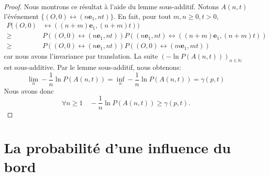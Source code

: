 \documentclass[titlepage,a4paper,12pt]{article}
\newcounter{prop}
\newtheorem{tension}[prop]{Proposition}
\begin{document}
\begin{proof}
Nous montrons ce résultat à l'aide du lemme sous-additif. Notons $A(n,t)$ l'événement $\{(O,0)\longleftrightarrow (n\mathbf{e}_1,nt)\}$. En fait, pour tout $m,n\geqslant 0, t>0$,
\begin{align*}
P((O,0)& \leftrightarrow ((n+m)\mathbf{e}_1,(n+m)t)) \\
\geqslant & P((O,0)\leftrightarrow (n\mathbf{e}_1,nt))P((n\mathbf{e}_1,nt)\leftrightarrow ((n+m)\mathbf{e}_1,(n+m)t))\\
\geqslant & P((O,0)\leftrightarrow (n\mathbf{e}_1,nt))P((O,0)\leftrightarrow (m\mathbf{e}_1,mt))
\end{align*}
car nous avons l'invariance par translation. La suite $(-\ln P(A(n,t)))_{n\in \mathbb{N}}$ est sous-additive. Par le lemme sous-additif, nous obtenons:
$$
\lim_{n}-\frac{1}{n}\ln P(A(n,t)) = \inf_{n} -\frac{1}{n}\ln P(A(n,t)) = \gamma(p,t)
$$
Nous avons donc
$$ \forall n\geqslant 1 \quad -\frac{1}{n}\ln P(A(n,t)) \geqslant \gamma(p,t).
$$
\end{proof}

\begin{comment}
Nous étudions la constante $\gamma(p,t)$ et nous avons la proposition suivante:
\begin{tension}$\frac{\gamma(p,t)}{\gamma(p,0)} \rightarrow 1$ quand $p\rightarrow 1$.
\end{tension}
\begin{proof}
Nous utilisons le fait que $\lim_n \frac{1}{n}\ln P(O\longleftrightarrow n\mathbf{e}_1) = \lim_n \frac{1}{n}\ln P(O\longleftrightarrow \partial \Lambda_n)$ et nous considérons une boite de taille $n$. Nous remarquons le nombre d'arête qui se ferme entre $[0,t]$ est borné par une loi de Poisson de paramètre $n^2(1-p)t$. Nous notons $N$ le nombre de bout d'un space-time chemin, c'est-à-dire le nombre de chemins fermés tel que $$ (O,0) = (x_1,\theta_1) \longleftrightarrow (x_1,\theta_2) \longleftrightarrow (x_2,\theta_2)\dots \longleftrightarrow (x_N,\theta_N) \longleftrightarrow (\partial\Lambda_n,t).
$$
Nous avons donc $N$ est borné par une variable aléatoire de loi de Poisson de paramètre $n^2(1-p)t$. Quand $p\rightarrow 1$, nous pouvons rendre $N$ d'ordre de 1 avec une probabilité proche de 1 et nous avons le résultat.
\end{proof}
\end{comment}
\section{La probabilité d'une influence du bord}
\end{document}
